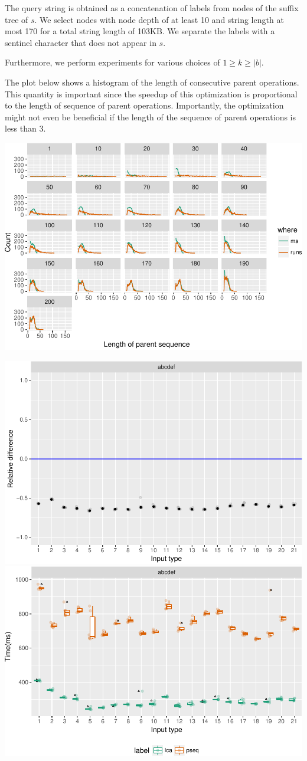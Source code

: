 \documentclass[]{article}
\begin{document}
The query string is obtained as a concatenation of labels from nodes of
the suffix tree of \(s\). We select nodes with node depth of at least 10
and string length at most 170 for a total string length of 103KB. We
separate the labels with a sentinel character that does not appear in
\(s\).

Furthermore, we perform experiments for various choices of
\(1 \geq k \geq |b|\).

The plot below shows a histogram of the length of consecutive parent
operations. This quantity is important since the speedup of this
optimization is proportional to the length of sequence of parent
operations. Importantly, the optimization might not even be beneficial
if the length of the sequence of parent operations is less than 3.

\includegraphics{sea_2018_files/figure-latex/unnamed-chunk-1-1.pdf}

\includegraphics{sea_2018_files/figure-latex/unnamed-chunk-2-1.pdf}
\includegraphics{sea_2018_files/figure-latex/unnamed-chunk-2-2.pdf}
\end{document}
